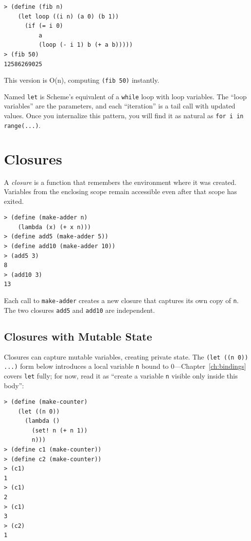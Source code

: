 \begin{lstlisting}[style=repl]
> (define (fib n)
    (let loop ((i n) (a 0) (b 1))
      (if (= i 0)
          a
          (loop (- i 1) b (+ a b)))))
> (fib 50)
12586269025
\end{lstlisting}

This version is O(n), computing \texttt{(fib 50)} instantly.

\begin{note}
Named \texttt{let} is Scheme's equivalent of a \texttt{while} loop with loop variables. The ``loop variables'' are the parameters, and each ``iteration'' is a tail call with updated values. Once you internalize this pattern, you will find it as natural as \texttt{for i in range(...)}.
\end{note}

\section{Closures}

A \emph{closure} is a function that remembers the environment where it was created. Variables from the enclosing scope remain accessible even after that scope has exited.

\begin{lstlisting}[style=repl]
> (define (make-adder n)
    (lambda (x) (+ x n)))
> (define add5 (make-adder 5))
> (define add10 (make-adder 10))
> (add5 3)
8
> (add10 3)
13
\end{lstlisting}

Each call to \texttt{make-adder} creates a new closure that captures its own copy of \texttt{n}. The two closures \texttt{add5} and \texttt{add10} are independent.

\subsection{Closures with Mutable State}

Closures can capture mutable variables, creating private state. The \texttt{(let ((n 0)) ...)} form below introduces a local variable \texttt{n} bound to 0---Chapter~\ref{ch:bindings} covers \texttt{let} fully; for now, read it as ``create a variable \texttt{n} visible only inside this body'':

\begin{lstlisting}[style=repl]
> (define (make-counter)
    (let ((n 0))
      (lambda ()
        (set! n (+ n 1))
        n)))
> (define c1 (make-counter))
> (define c2 (make-counter))
> (c1)
1
> (c1)
2
> (c1)
3
> (c2)
1
\end{lstlisting}

